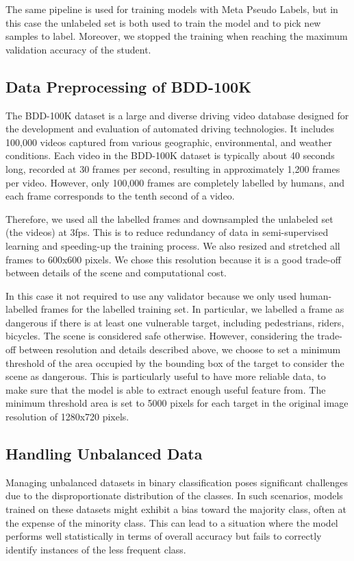 The same pipeline is used for training models with Meta Pseudo Labels, but in 
this case the unlabeled set is both used to train the model and to pick new 
samples to label. Moreover, we stopped the training when reaching the maximum 
validation accuracy of the student. 

\subsection{Data Preprocessing of BDD-100K}
The BDD-100K dataset is a large and diverse driving video database designed for 
the development and evaluation of automated driving technologies. It includes 
100,000 videos captured from various geographic, environmental, and weather 
conditions.
Each video in the BDD-100K dataset is typically about 40 seconds long, recorded 
at 30 frames per second, resulting in approximately 1,200 frames per video. 
However, only 100,000 frames are completely labelled by humans, and each frame 
corresponds to the tenth second of a video.

Therefore, we used all the labelled frames and downsampled the unlabeled set (the 
videos) at 3fps. This is to reduce redundancy of data in semi-supervised 
learning and speeding-up the training process.
We also resized and stretched all frames to 600x600 pixels. We chose this 
resolution because it is a good trade-off between details of the scene and 
computational cost.

In this case it not required to use any validator because we only used 
human-labelled frames for the labelled training set. In particular, we labelled 
a frame as dangerous if there is at least one vulnerable target, including 
pedestrians, riders, bicycles. The scene is considered safe otherwise.
However, considering the trade-off between resolution and details described above, 
we choose to set a minimum threshold of the area occupied by the bounding box 
of the target to consider the scene as dangerous. This is particularly useful 
to have more reliable data, to make sure that the model is able to extract 
enough useful feature from.
The minimum threshold area is set to 5000 pixels for each target in the original 
image resolution of 1280x720 pixels.

\subsection{Handling Unbalanced Data}
Managing unbalanced datasets in binary classification poses significant challenges 
due to the disproportionate distribution of the classes. In such scenarios, 
models trained on these datasets might exhibit a bias toward the majority class, 
often at the expense of the minority class. This can lead to a situation where 
the model performs well statistically in terms of overall accuracy but fails to 
correctly identify instances of the less frequent class.

